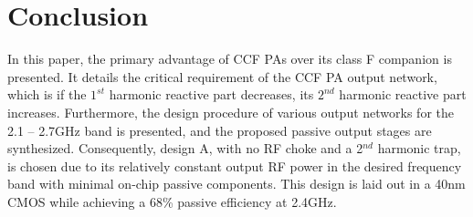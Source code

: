 \documentclass[conference]{IEEEtran}
\begin{document}
\section{Conclusion}
\label{section:Conclusion}
In this paper, the primary advantage of CCF PAs over its class F companion is presented. It details the critical requirement of the CCF PA output network, which is if the $1^{st}$ harmonic reactive part decreases, its $2^{nd}$ harmonic reactive part increases. Furthermore, the design procedure of various output networks for the 2.1 -- 2.7GHz band is presented, and the proposed passive output stages are synthesized.  Consequently, design A, with no RF choke and a 2$^{nd}$ harmonic trap, is chosen due to its relatively constant output RF power in the desired frequency band with minimal on-chip passive components. This design is laid out in a 40nm CMOS while achieving a 68\% passive efficiency at 2.4GHz.



\end{document}
